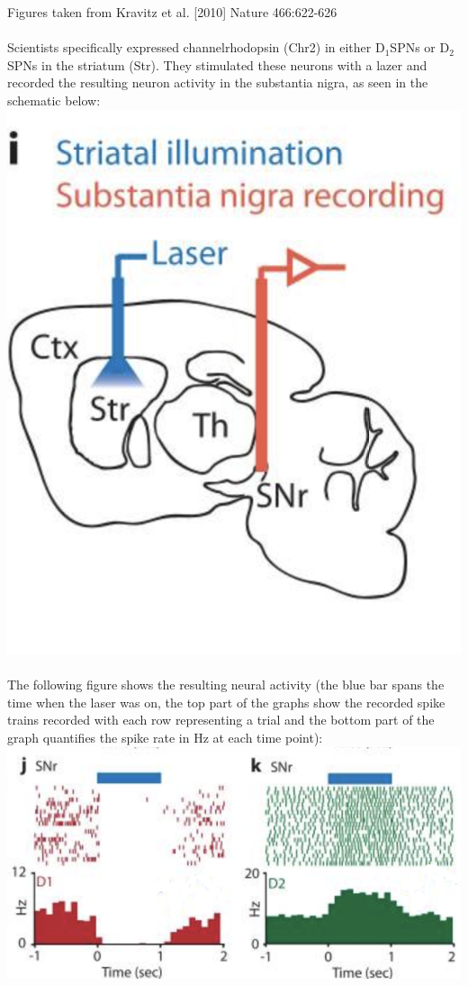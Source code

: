 \documentclass{article}
\begin{document}
Figures taken from Kravitz et al. [2010] Nature 466:622-626
\\\\Scientists specifically expressed channelrhodopsin (Chr2) in either D$_1$SPNs or D$_2$SPNs in the striatum (Str). They stimulated these neurons with a lazer and recorded the resulting neuron activity in the substantia nigra, as seen in the schematic below:\\
\includegraphics[scale = .5]{1.1}\\
\\ The following figure shows the resulting neural activity (the blue bar spans the time when the laser was on, the top part of the graphs show the recorded spike trains recorded with each row representing a trial and the bottom part of the graph quantifies the spike rate in Hz at each time point):\\
\includegraphics[scale = .8]{1.2}\\
\end{document}
